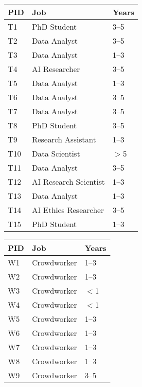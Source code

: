 \begin{table*}
\centering
\begin{minipage}[b]{0.32\textwidth} %
\centering
\begin{tabular}{lll}
\toprule
\textbf{PID} & \textbf{Job} & \textbf{Years} \\
\midrule
T1 & PhD Student & 3--5 \\
T2 & Data Analyst & 3--5 \\
T3 & Data Analyst & 1--3 \\
T4 & AI Researcher & 3--5 \\
T5 & Data Analyst & 1--3 \\
T6 & Data Analyst & 3--5 \\
T7 & Data Analyst & 3--5 \\
T8 & PhD Student & 3--5 \\
T9 & Research Assistant & 1--3 \\
T10 & Data Scientist & $>$5 \\
T11 & Data Analyst & 3--5 \\
T12 & AI Research Scientist & 1--3 \\
T13 & Data Analyst & 1--3 \\
T14 & AI Ethics Researcher & 3--5 \\
T15 & PhD Student & 1--3 \\
\bottomrule
\end{tabular}
\caption{Task Designer Participants}
\label{tab:task-designer}
\end{minipage}
\hfill
\begin{minipage}[b]{0.32\textwidth}
\centering
\begin{tabular}{lll}
\toprule
\textbf{PID} & \textbf{Job} & \textbf{Years} \\
\midrule
W1 & Crowdworker & 1--3 \\
W2 & Crowdworker & 1--3 \\
W3 & Crowdworker & $<$1 \\
W4 & Crowdworker & $<$1 \\
W5 & Crowdworker & 1--3 \\
W6 & Crowdworker & 1--3 \\
W7 & Crowdworker & 1--3 \\
W8 & Crowdworker & 1--3 \\
W9 & Crowdworker & 3--5 \\

\end{tabular}
\end{minipage}
\end{table*}
